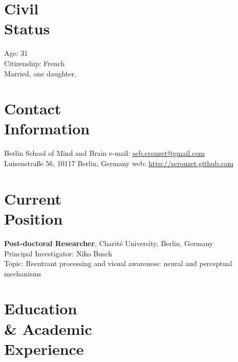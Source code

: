\documentclass[margin,line]{resume}
\begin{document}
\begin{resume}

    \section{\mysidestyle Civil\\Status}
    Age: 31\\
    Citizenship: French\\
    Married, one daughter.
    \vspace{3mm}


    \section{\mysidestyle Contact\\Information}
    Berlin School of Mind and Brain             \hfill e-mail: \href{mailto:seb.crouzet@gmail.com}{seb.crouzet@gmail.com} \\
    Luisenstraße 56, 10117 Berlin, Germany      \hfill web: \url{http://scrouzet.github.com} 
    
	
    \vspace{3mm}
    \section{\mysidestyle Current\\Position}
    \textbf{Post-doctoral Researcher}, Charité University, Berlin, Germany\\
    Principal Investigator: Niko Busch\\
    Topic: Reentrant processing and visual awareness: neural and perceptual mechanisms 

    \vspace{3mm}
    \section{\mysidestyle Education \\ \& Academic \\ Experience }
	

\end{resume}
\end{document}
